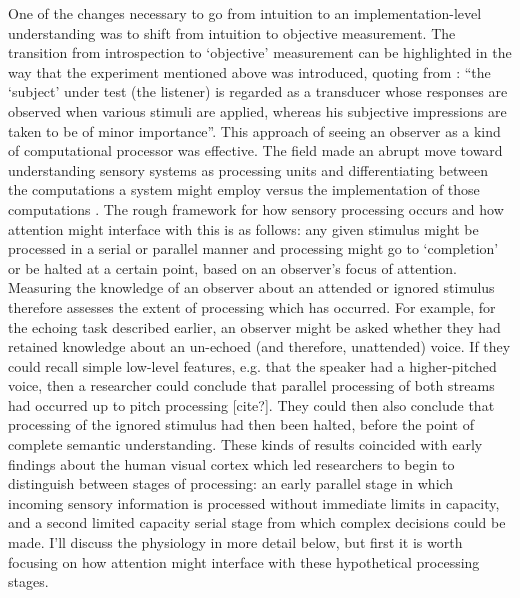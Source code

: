 One of the changes necessary to go from intuition to an implementation-level understanding was to shift from intuition to objective measurement. The transition from introspection to ‘objective’ measurement can be highlighted in the way that the experiment mentioned above was introduced, quoting from \citet{Cherry1953-as}: ``the `subject' under test (the listener) is regarded as a transducer whose responses are observed when various stimuli are applied, whereas his subjective impressions are taken to be of minor importance''. This approach of seeing an observer as a kind of computational processor was effective. The field made an abrupt move toward understanding sensory systems as processing units and differentiating between the computations a system might employ versus the implementation of those computations \citep{Marr1982-fg}. The rough framework for how sensory processing occurs and how attention might interface with this is as follows: any given stimulus might be processed in a serial or parallel manner and processing might go to `completion' or be halted at a certain point, based on an observer's focus of attention. Measuring the knowledge of an observer about an attended or ignored stimulus therefore assesses the extent of processing which has occurred. For example, for the echoing task described earlier, an observer might be asked whether they had retained knowledge about an un-echoed (and therefore, unattended) voice. If they could recall simple low-level features, e.g. that the speaker had a higher-pitched voice, then a researcher could conclude that parallel processing of both streams had occurred up to pitch processing [cite?]. They could then also conclude that processing of the ignored stimulus had then been halted, before the point of complete semantic understanding. These kinds of results coincided with early findings about the human visual cortex \citep{Kuffler1953-qw,Hubel1962-pn,Hubel1968-na} which led researchers to begin to distinguish between stages of processing: an early parallel stage in which incoming sensory information is processed without immediate limits in capacity, and a second limited capacity serial stage from which complex decisions could be made. I'll discuss the physiology in more detail below, but first it is worth focusing on how attention might interface with these hypothetical processing stages. 

